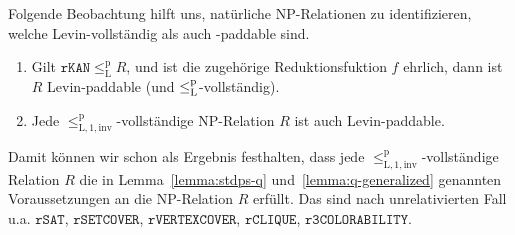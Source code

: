 Folgende Beobachtung hilft uns, natürliche NP-Relationen zu identifizieren, welche Levin-vollständig als auch -paddable sind.

\begin{observation}\label{obs:invcomplete-sind-levinpaddable}
    \begin{enumerate}
        \item Gilt $\mathtt{rKAN}\leq_\mathrm{L}^\mathrm{p} R$, und ist die zugehörige Reduktionsfuktion $f$ ehrlich, dann ist $R$ Levin-paddable (und $\leq_\mathrm{L}^\mathrm{p}$-vollständig).
        \item Jede $\leq_\mathrm{L,1,inv}^\mathrm{p}$-vollständige NP-Relation $R$ ist auch Levin-paddable.
    \end{enumerate}
\end{observation}
Damit können wir schon als Ergebnis festhalten, dass 
jede $\leq_\mathrm{L,1,inv}^\mathrm{p}$-vollständige Relation $R$ die in 
Lemma~\ref{lemma:stdps-q} und~\ref{lemma:q-generalized} genannten Voraussetzungen an die NP-Relation $R$ erfüllt.
Das sind nach \textcite{goldreich_computational_2008} unrelativierten Fall u.a. $\mathtt{rSAT}$, $\mathtt{rSETCOVER}$, $\mathtt{rVERTEXCOVER}$, $\mathtt{rCLIQUE}$, $\mathtt{r3COLORABILITY}$.
